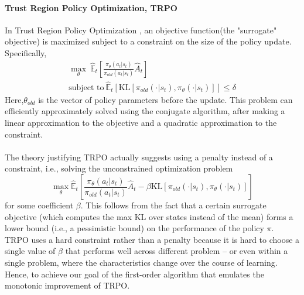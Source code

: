 \paragraph{Trust Region Policy Optimization, TRPO} In Trust Region Policy Optimization \cite{Schulman2015Trust, Wu2017Scalable}, an objective function(the "surrogate" objective) is maximized subject to a constraint on the size of the policy update. Specifically,
\begin{equation}
\begin{aligned}
\max_{\theta} \ \hat{\mathbb{E}}_{t}\left[\frac{\pi_{\theta}(a_{t}|s_{t})}{\pi_{old}(a_{t}|s_{t})}\hat{A}_{t}\right]\\
\text{subject to} \ \hat{\mathbb{E}}_{t}[\text{KL}[\pi_{old}(\cdot|s_{t}), \pi_{\theta}(\cdot|s_{t})]] \leq \delta
\end{aligned}
\end{equation}
Here,$\theta_{old}$ is the vector of policy parameters before the update. This problem can efficiently approximately solved using the conjugate algorithm, after making a linear approximation to the objective and a quadratic approximation to the constraint.
\paragraph{}The theory justifying TRPO actually suggests using a penalty instead of a constraint, i.e., solving the unconstrained optimization problem
\begin{equation}
\max_{\theta}\hat{\mathbb{E}}_{t}\left[\frac{\pi_{\theta}(a_{t}|s_{t})}{\pi_{old}(a_{t}|s_{t})}\hat{A}_{t} - \beta \text{KL}[\pi_{old}(\cdot|s_{t}), \pi_{\theta}(\cdot|s_{t})] \right]
\end{equation}
for some coefficient $\beta$. This follows from the fact that a certain surrogate objective (which computes the max KL over states instead of the mean) forms a lower bound (i.e., a pessimistic bound) on the performance of the policy $\pi$. TRPO uses a hard constraint rather than a penalty because it is hard to choose a single value of $\beta$ that performs well across different problem -- or even within a single problem, where the characteristics change over the course of learning. Hence, to achieve our goal of the first-order algorithm that emulates the monotonic improvement of TRPO.